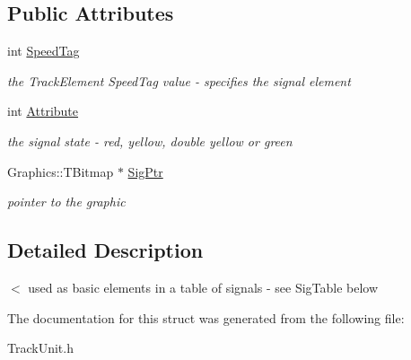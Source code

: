 \subsection*{Public Attributes}
\begin{DoxyCompactItemize}
\item 
\mbox{\label{struct_t_track_1_1_t_sig_element_a34471e55de8fcc915046b28706156071}} 
int \mbox{\hyperlink{struct_t_track_1_1_t_sig_element_a34471e55de8fcc915046b28706156071}{Speed\+Tag}}
\begin{DoxyCompactList}\small\item\em the Track\+Element Speed\+Tag value -\/ specifies the signal element \end{DoxyCompactList}\item 
\mbox{\label{struct_t_track_1_1_t_sig_element_aaf0195d7519c41c5f2acc57c07b6fb83}} 
int \mbox{\hyperlink{struct_t_track_1_1_t_sig_element_aaf0195d7519c41c5f2acc57c07b6fb83}{Attribute}}
\begin{DoxyCompactList}\small\item\em the signal state -\/ red, yellow, double yellow or green \end{DoxyCompactList}\item 
\mbox{\label{struct_t_track_1_1_t_sig_element_a8e0002e65092d0c2f40adc3980de42c3}} 
Graphics\+::\+T\+Bitmap $\ast$ \mbox{\hyperlink{struct_t_track_1_1_t_sig_element_a8e0002e65092d0c2f40adc3980de42c3}{Sig\+Ptr}}
\begin{DoxyCompactList}\small\item\em pointer to the graphic \end{DoxyCompactList}\end{DoxyCompactItemize}


\subsection{Detailed Description}
$<$ used as basic elements in a table of signals -\/ see Sig\+Table below 

The documentation for this struct was generated from the following file\+:\begin{DoxyCompactItemize}
\item 
Track\+Unit.\+h\end{DoxyCompactItemize}
